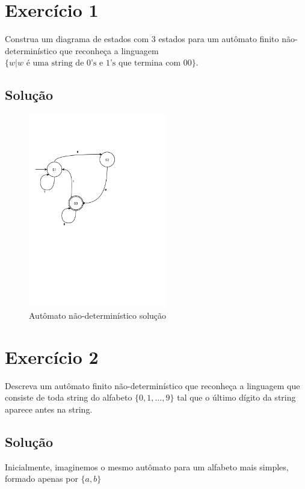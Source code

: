 \documentclass[a4paper, 12pt]{article}
\begin{document}
\newpage
\tableofcontents
\thispagestyle{empty}

\newpage
{}

\newpage
\section{Exercício 1}

Construa um diagrama de estados com 3 estados para um autômato finito
não-determinístico que reconheça a linguagem $\{ w | w \text{ é uma string de }0\text{’s e }1\text{’s
que termina com }00\}$.

\subsection{Solução}

\begin{figure}[!ht]
    \centering
    \includegraphics[width=6cm]{./imgs/task-2-1.pdf}
    \caption{Autômato não-determinístico solução}
    \label{fig:solution_t2_1}
\end{figure}


\newpage
\section{Exercício 2}
Descreva um autômato finito não-determinístico que reconheça a linguagem
que consiste de toda string do alfabeto $\{0, 1, …, 9\}$ tal que o último dígito da
string aparece antes na string.

\subsection{Solução}

Inicialmente, imaginemos o mesmo autômato para um alfabeto mais simples, formado apenas por $\{a, b\}$
\end{document}
